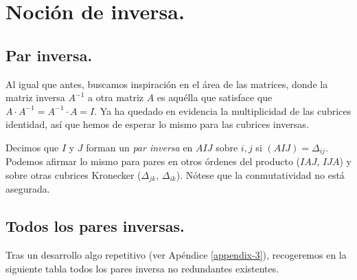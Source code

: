 \section{Noción de inversa.} \label{inverse}

\subsection{Par inversa.} \label{inverse-pair}

Al igual que antes, buscamos inspiración en el área de las matrices, donde la matriz inversa $A^{-1}$ a otra matriz $A$ es aquélla que satisface que ${A\cdot A^{-1} = A^{-1} \cdot A = I}$. Ya ha quedado en evidencia la multiplicidad de las cubrices identidad, así que hemos de esperar lo mismo para las cubrices inversas.

Decimos que $I$ y $J$ forman un \textit{par inversa} en $AIJ$ sobre $i, j$ si $(AIJ) = \Delta_{ij}$. Podemos afirmar lo mismo para pares en otros órdenes del producto ($IAJ$, $IJA$) y sobre otras cubrices Kronecker ($\Delta_{jk}$, $\Delta_{ik}$). Nótese que la conmutatividad no está asegurada.

\subsection{Todos los pares inversas.} \label{inverse-all-pairs}

Tras un desarrollo algo repetitivo (ver Apéndice \ref{appendix-3}), recogeremos en la siguiente tabla todos los pares inversa no redundantes existentes.

